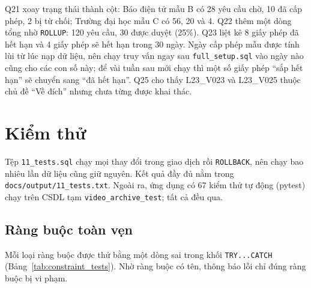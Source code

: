 Q21 xoay trạng thái thành cột: Báo điện tử mẫu B có 28 yêu cầu chờ, 10 đã cấp phép, 2 bị từ
chối; Trường đại học mẫu C có 56, 20 và 4. Q22 thêm một dòng tổng nhờ \texttt{ROLLUP}: 120
yêu cầu, 30 được duyệt (25\%). Q23 liệt kê 8 giấy phép đã hết hạn và 4 giấy phép sẽ hết
hạn trong 30 ngày. Ngày cấp phép mẫu được tính lùi từ lúc nạp dữ liệu, nên chạy truy vấn
ngay sau \texttt{full\_setup.sql} vào ngày nào cũng cho các con số này; để vài tuần sau mới
chạy thì một số giấy phép ``sắp hết hạn'' sẽ chuyển sang ``đã hết hạn''. Q25 cho thấy L23\_V023 và L23\_V025 thuộc chủ đề
``Về đích'' nhưng chưa từng được khai thác.

\section{Kiểm thử}
\label{sec:tests}

Tệp \texttt{11\_tests.sql} chạy mọi thay đổi trong giao dịch rồi \texttt{ROLLBACK}, nên chạy
bao nhiêu lần dữ liệu cũng giữ nguyên. Kết quả đầy đủ nằm trong
\texttt{docs/output/11\_tests.txt}. Ngoài ra, ứng dụng có 67 kiểm thử tự động (pytest)
chạy trên CSDL tạm \texttt{video\_archive\_test}; tất cả đều qua.

\subsection{Ràng buộc toàn vẹn}

Mỗi loại ràng buộc được thử bằng một dòng sai trong khối \texttt{TRY...CATCH}
(Bảng~\ref{tab:constraint_tests}). Nhờ ràng buộc có tên, thông báo lỗi chỉ đúng ràng buộc
bị vi phạm.

